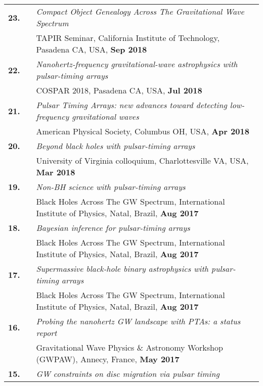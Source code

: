 \documentclass[11pt,letterpaper,sans]{moderncv}
\begin{document}
{\begin{longtable}{rp{0.3cm}p{15.8cm}}
\textbf{23.} & & \textit{Compact Object Genealogy Across The Gravitational Wave Spectrum} \\
&& TAPIR Seminar, California Institute of Technology, Pasadena CA, USA, \textbf{Sep 2018} \vspace{0.09cm}\\
\textbf{22.} & & \textit{Nanohertz-frequency gravitational-wave astrophysics with pulsar-timing arrays} \\
&& COSPAR 2018, Pasadena CA, USA, \textbf{Jul 2018} \vspace{0.09cm}\\
\textbf{21.} & & \textit{Pulsar Timing Arrays: new advances toward detecting low-frequency gravitational waves} \\
&& American Physical Society, Columbus OH, USA, \textbf{Apr 2018} \vspace{0.09cm}\\
\textbf{20.} & & \textit{Beyond black holes with pulsar-timing arrays} \\
&& University of Virginia colloquium, Charlottesville VA, USA, \textbf{Mar 2018} \vspace{0.09cm}\\
\textbf{19.} & & \textit{Non-BH science with pulsar-timing arrays} \\
&& Black Holes Across The GW Spectrum, International Institute of Physics, Natal, Brazil, \textbf{Aug 2017} \vspace{0.09cm}\\
\textbf{18.} & & \textit{Bayesian inference for pulsar-timing arrays} \\
&& Black Holes Across The GW Spectrum, International Institute of Physics, Natal, Brazil, \textbf{Aug 2017} \vspace{0.09cm}\\
\textbf{17.} & & \textit{Supermassive black-hole binary astrophysics with pulsar-timing arrays} \\
&& Black Holes Across The GW Spectrum, International Institute of Physics, Natal, Brazil, \textbf{Aug 2017} \vspace{0.09cm}\\
\textbf{16.} & & \textit{Probing the nanohertz GW landscape with PTAs: a status report} \\
&& Gravitational Wave Physics \& Astronomy Workshop (GWPAW), Annecy, France, \textbf{May 2017} \vspace{0.09cm}\\
\textbf{15.} & & \textit{GW constraints on disc migration via pulsar timing} \\

\end{longtable}}
\end{document}
